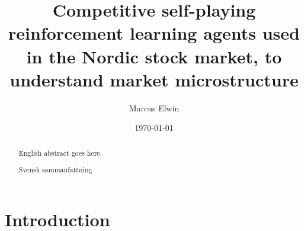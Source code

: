 \documentclass{kththesis}
\title{Competitive self-playing reinforcement learning agents used in the Nordic stock market, to understand market microstructure}
\author{Marcus Elwin}
\date{\today}
\theoremstyle{definition}
\begin{document}
\frontmatter

\titlepage

\begin{abstract}
  English abstract goes here.

\end{abstract}


\begin{otherlanguage}{swedish}
  \begin{abstract}
    Svensk sammanfattning
  \end{abstract}
\end{otherlanguage}


\tableofcontents


\mainmatter


\chapter{Introduction}

\end{document}
